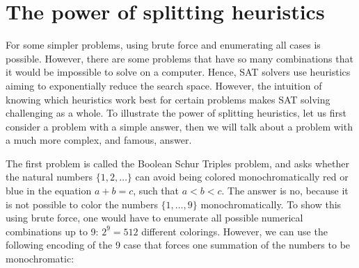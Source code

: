 \section{The power of splitting heuristics} \label{subsec:splitheur}
For some simpler problems, using brute force and enumerating all cases is possible. However, there are some problems that have so many combinations that it would be impossible to solve on a computer. Hence, SAT solvers use heuristics aiming to exponentially reduce the search space. However, the intuition of knowing which heuristics work best for certain problems makes SAT solving challenging as a whole. To illustrate the power of splitting heuristics, let us first consider a problem with a simple answer, then we will talk about a problem with a much more complex, and famous, answer.\par
The first problem is called the Boolean Schur Triples problem, and asks whether the natural numbers $\{1, 2, \ldots \}$ can avoid being colored monochromatically red or blue in the equation $a + b = c$, such that $a < b < c$. The answer is no, because it is not possible to color the numbers $\{1, \ldots, 9\}$ monochromatically. To show this using brute force, one would have to enumerate all possible numerical combinations up to 9: $2^9 = 512$ different colorings. However, we can use the following encoding of the 9 case that forces one summation of the numbers to be monochromatic:
